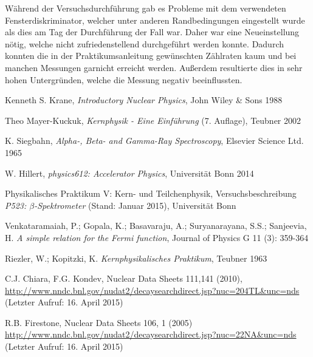 \documentclass[11pt, a4paper]{article}
\numberwithin{equation}{section}
\begin{document}
Während der Versuchsdurchführung gab es Probleme mit dem verwendeten Fensterdiskriminator, welcher unter anderen Randbedingungen eingestellt wurde als dies am Tag der Durchführung der Fall war.
Daher war eine Neueinstellung nötig, welche nicht zufriedenstellend durchgeführt werden konnte.
Dadurch konnten die in der Praktikumsanleitung gewünschten Zählraten kaum und bei manchen Messungen garnicht erreicht werden.
Außerdem resultierte dies in sehr hohen Untergründen, welche die Messung negativ beeinflussten.

\FloatBarrier
\vspace{\fill}
\begin{thebibliography}{19}

	Kenneth S. Krane,
	\emph{Introductory Nuclear Physics},
	John Wiley \& Sons 1988

	Theo Mayer-Kuckuk,
	\emph{Kernphysik - Eine Einführung} (7. Auflage),
	Teubner 2002

	K. Siegbahn,
	\emph{Alpha-, Beta- and Gamma-Ray Spectroscopy},
	Elsevier Science Ltd. 1965

	W. Hillert,
	\emph{physics612: Accelerator Physics},
	Universität Bonn 2014

	Physikalisches Praktikum V: Kern- und Teilchenphysik,
	Versuchsbeschreibung \emph{P523: $\beta$-Spektrometer} (Stand: Januar 2015),
	Universität Bonn	

	Venkataramaiah, P.; Gopala, K.; Basavaraju, A.; Suryanarayana, S.S.; Sanjeevia, H.
	\emph{A simple relation for the Fermi function},
	Journal of Physics G 11 (3): 359-364

	Riezler, W.; Kopitzki, K.
	\emph{Kernphysikalisches Praktikum},
	Teubner 1963

  C.J. Chiara, F.G. Kondev,
  Nuclear Data Sheets 111,141 (2010),
  \url{http://www.nndc.bnl.gov/nudat2/decaysearchdirect.jsp?nuc=204TL&unc=nds}
  (Letzter Aufruf: 16. April 2015)

  R.B. Firestone,
  Nuclear Data Sheets 106, 1 (2005)
  \url{http://www.nndc.bnl.gov/nudat2/decaysearchdirect.jsp?nuc=22NA&unc=nds}
  (Letzter Aufruf: 16. April 2015)




  

\end{thebibliography}
\end{document}
